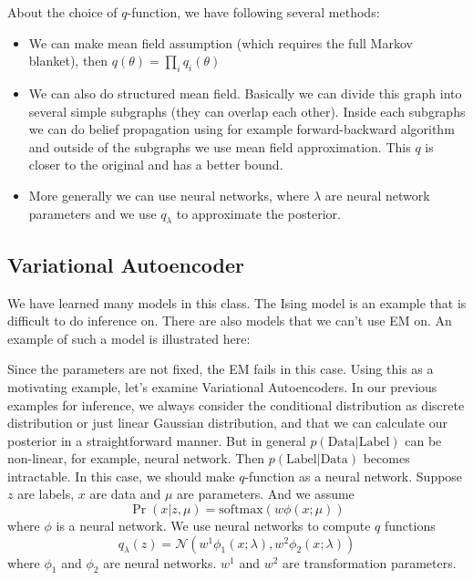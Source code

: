 \documentclass{article}
\begin{document}
About the choice of $q$-function, we have following several methods:
\begin{itemize}
\item We can make mean field assumption (which requires the full Markov blanket), then $q(\theta) = \prod_i q_i(\theta)$
\item We can also do structured mean field. Basically we can divide this graph into several simple subgraphs (they can overlap each other). Inside each subgraphs we can do belief propagation using for example forward-backward algorithm and outside of the subgraphs we use mean field approximation. This $q$ is closer to the original and has a better bound.
\item More generally we can use neural networks, where $\lambda$ are neural network parameters and we use $q_\lambda$ to approximate the posterior. 
\end{itemize}
\subsection{Variational Autoencoder}
We have learned many models in this class. The Ising model is an example that is difficult to do inference on. There are also models that we can't use EM on. An example of such a model is illustrated here: \\

\begin{center}
\end{center}
Since the parameters are not fixed, the EM fails in this case. Using this as a motivating example, let's examine Variational Autoencoders. In our previous examples for inference, we always consider the conditional distribution as discrete distribution or just linear Gaussian distribution, and that we can calculate our posterior in a straightforward manner. But in general $p(\textrm{Data}|\textrm{Label})$ can be non-linear, for example, neural network. Then $p(\textrm{Label}|\textrm{Data})$ becomes intractable. In this case, we should make $q$-function as a neural network. Suppose $z$ are labels, $x$ are data and $\mu$ are parameters. 
And we assume
$$\Pr(x | z, \mu) = \textrm{softmax}(w\phi(x; \mu))$$
where $\phi$ is a neural network. We use neural networks to compute $q$ functions
$$ q_{\lambda}(z) = \mathcal{N}(w^1\phi_1(x; \lambda), w^2\phi_2(x; \lambda)) $$
where $\phi_1$ and $\phi_2$ are neural networks. $w^1$ and $w^2$ are transformation parameters. 
\end{document}
